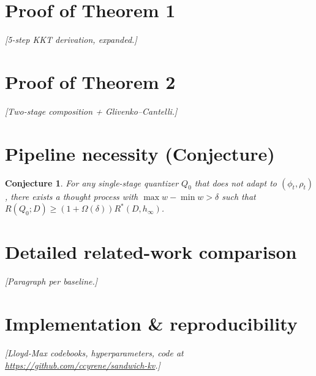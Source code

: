 \documentclass[11pt]{article}
\newtheorem{conjecture}{Conjecture}
\theoremstyle{definition}
\newcommand{\hinf}{h_\infty}
\begin{document}



\appendix
\section{Proof of Theorem 1}\label{app:proof-1}\textit{[5-step KKT derivation, expanded.]}
\section{Proof of Theorem 2}\label{app:proof-2}\textit{[Two-stage composition + Glivenko--Cantelli.]}
\section{Pipeline necessity (Conjecture)}\label{app:conjecture}
\begin{conjecture}
For any single-stage quantizer $Q_0$ that does not adapt to $(\phi_t, \rho_t)$, there exists a thought process with $\max w - \min w > \delta$ such that $R(Q_0; D) \ge (1 + \Omega(\delta)) R^*(D, \hinf)$.
\end{conjecture}
\section{Detailed related-work comparison}\label{app:related}\textit{[Paragraph per baseline.]}
\section{Implementation \& reproducibility}\label{app:impl}\textit{[Lloyd-Max codebooks, hyperparameters, code at \url{https://github.com/ccyrene/sandwich-kv}.]}
\end{document}
